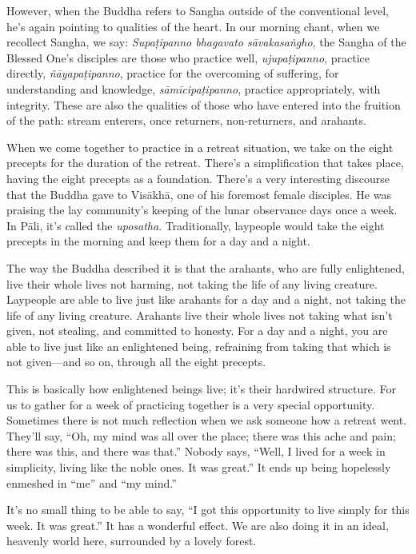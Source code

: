 However, when the Buddha refers to Sangha outside of the conventional
level, he’s again pointing to qualities of the heart. In our morning
chant, when we recollect Sangha, we say: \emph{Supaṭipanno bhagavato
sāvakasaṅgho}, the Sangha of the Blessed One’s disciples are those who
practice well, \emph{ujupaṭipanno}, practice directly,
\emph{ñāyapaṭipanno}, practice for the overcoming of suffering, for
understanding and knowledge, \emph{sāmīcipaṭipanno}, practice
appropriately, with integrity. These are also the qualities of those who
have entered into the fruition of the path: stream enterers, once
returners, non-returners, and arahants.

When we come together to practice in a retreat situation, we take on the
eight precepts for the duration of the retreat. There’s a simplification
that takes place, having the eight precepts as a foundation. There’s a
very interesting discourse that the Buddha gave to Visākhā, one of his
foremost female disciples. He was praising the lay community’s keeping
of the lunar observance days once a week. In Pāli, it’s called the
\emph{uposatha}. Traditionally, laypeople would take the eight precepts
in the morning and keep them for a day and a night.

The way the Buddha described it is that the arahants, who are fully
enlightened, live their whole lives not harming, not taking the life of
any living creature. Laypeople are able to live just like arahants for a
day and a night, not taking the life of any living creature. Arahants
live their whole lives not taking what isn’t given, not stealing, and
committed to honesty. For a day and a night, you are able to live just
like an enlightened being, refraining from taking that which is not
given—and so on, through all the eight precepts.

This is basically how enlightened beings live; it’s their hardwired
structure. For us to gather for a week of practicing together is a very
special opportunity. Sometimes there is not much reflection when we ask
someone how a retreat went. They’ll say, “Oh, my mind was all over the
place; there was this ache and pain; there was this, and there was
that.” Nobody says, “Well, I lived for a week in simplicity, living like
the noble ones. It was great.” It ends up being hopelessly enmeshed in
“me” and “my mind.”

It’s no small thing to be able to say, “I got this opportunity to live
simply for this week. It was great.” It has a wonderful effect. We are
also doing it in an ideal, heavenly world here, surrounded by a lovely
forest.


